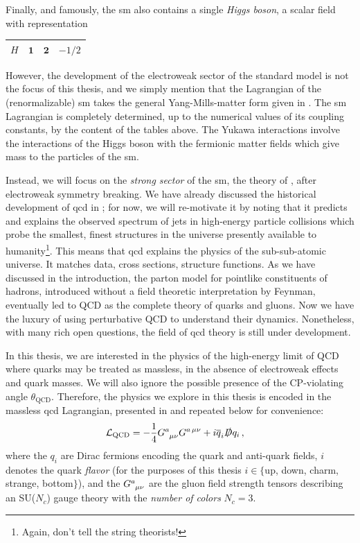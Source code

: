 %
Finally, and famously, the \gls{sm} also contains a single \textit{Higgs boson}, a scalar field with representation
\begin{center}
 \begin{tabular}{ |p{3cm}||p{3cm}|p{3cm}|p{3cm}|  }
 \hline
 \(H\)       & \(\mathbf{1}\)       & \(\mathbf{2}\) & \(-1/2\) \\
 \hline
\end{tabular}
\end{center}
However, the development of the electroweak sector of the standard model is not the focus of this thesis, and we simply mention that the Lagrangian of the (renormalizable) \gls{sm} takes the general Yang-Mills-matter form given in .
%
The \gls{sm} Lagrangian is completely determined, up to the numerical values of its coupling constants, by the content of the tables above.
%
The Yukawa interactions involve the interactions of the Higgs boson with the fermionic matter fields which give mass to the particles of the \gls{sm}.


Instead, we will focus on the \textit{strong sector} of the \gls{sm}, the theory of , after electroweak symmetry breaking.
%
We have already discussed the historical development of \gls{qcd} in ;
%
for now, we will re-motivate it by noting that it predicts and explains the observed spectrum of jets in high-energy particle collisions which probe the smallest, finest structures in the universe presently available to humanity\footnote{Again, don't tell the string theorists!}.
%
This means that \gls{qcd} explains the physics of the sub-sub-atomic universe.
%
It matches data, cross sections, structure functions.
%
As we have discussed in the introduction, the parton model for pointlike constituents of hadrons, introduced without a field theoretic interpretation by Feynman, eventually led to QCD as the complete theory of quarks and gluons.
%
Now we have the luxury of using perturbative QCD to understand their dynamics.
%
Nonetheless, with many rich open questions, the field of \gls{qcd} theory is still under development.

In this thesis, we are interested in the physics of the high-energy limit of QCD where quarks may be treated as massless, in the absence of electroweak effects and quark masses.
%
We will also ignore the possible presence of the CP-violating angle \(\theta_\text{QCD}\).
%
Therefore, the physics we explore in this thesis is encoded in the massless \gls{qcd} Lagrangian, presented in  and repeated below for convenience:
\begin{align}
    \mathcal{L}_\text{QCD}
    &=
    - \frac{1}{4} G\indices{^a_{\mu\nu}} G^{a\,\mu\nu}
    +
    i \overline{q}_i \slashed{D} q_i
    \,,
\end{align}
where the \(q_i\) are Dirac fermions encoding the quark and anti-quark fields, \(i\) denotes the quark \textit{flavor} (for the purposes of this thesis \(i \in \{\)up, down, charm, strange, bottom\(\}\)), and the \(G\indices{^a_{\mu\nu}}\) are the gluon field strength tensors describing an SU(\(N_c\)) gauge theory with the \textit{number of colors} \(N_c = 3\).

